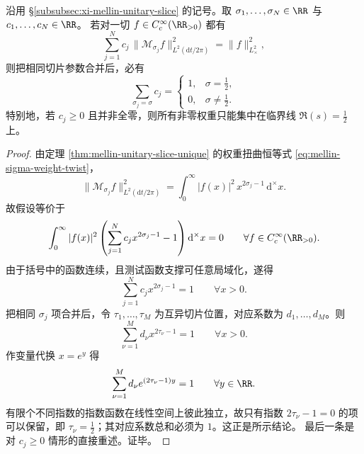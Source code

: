 \begin{theorem}\label{thm:conclusion-mellin-finite-mixture-rigidity}
沿用 \S\ref{subsubsec:xi-mellin-unitary-slice} 的记号。取 \(\sigma_1,\dots,\sigma_N\in\RR\) 与 \(c_1,\dots,c_N\in\RR\)。
若对一切 \(f\in C_c^\infty(\RR_{>0})\) 都有
\[
\sum_{j=1}^N c_j\,\|\mathcal M_{\sigma_j}f\|_{L^2(\mathrm{d}t/2\pi)}^2
=
\|f\|_{L^2_{\times}}^2,
\]
则把相同切片参数合并后，必有
\[
\sum_{\sigma_j=\sigma}c_j=
\begin{cases}
1,& \sigma=\tfrac12,\\
0,& \sigma\neq \tfrac12.
\end{cases}
\]
特别地，若 \(c_j\ge 0\) 且并非全零，则所有非零权重只能集中在临界线 \(\Re(s)=\tfrac12\) 上。
\end{theorem}
\begin{proof}
由定理 \ref{thm:mellin-unitary-slice-unique} 的权重扭曲恒等式 \eqref{eq:mellin-sigma-weight-twist}，
\[
\|\mathcal M_{\sigma_j}f\|_{L^2(\mathrm{d}t/2\pi)}^2
=
\int_0^\infty |f(x)|^2\,x^{2\sigma_j-1}\,\mathrm{d}^{\times}x.
\]
故假设等价于
\[
\int_0^\infty |f(x)|^2
\left(
\sum_{j=1}^N c_j x^{2\sigma_j-1}-1
\right)\mathrm{d}^{\times}x
=
0
\qquad
\forall f\in C_c^\infty(\RR_{>0}).
\]
由于括号中的函数连续，且测试函数支撑可任意局域化，遂得
\[
\sum_{j=1}^N c_j x^{2\sigma_j-1}=1
\qquad
\forall x>0.
\]
把相同 \(\sigma_j\) 项合并后，令 \(\tau_1,\dots,\tau_M\) 为互异切片位置，对应系数为 \(d_1,\dots,d_M\)。则
\[
\sum_{\nu=1}^M d_\nu x^{2\tau_\nu-1}=1
\qquad
\forall x>0.
\]
作变量代换 \(x=e^y\) 得
\[
\sum_{\nu=1}^M d_\nu e^{(2\tau_\nu-1)y}=1
\qquad
\forall y\in\RR.
\]
有限个不同指数的指数函数在线性空间上彼此独立，故只有指数 \(2\tau_\nu-1=0\) 的项可以保留，即 \(\tau_\nu=\tfrac12\)；其对应系数总和必须为 \(1\)。这正是所示结论。
最后一条是对 \(c_j\ge 0\) 情形的直接重述。证毕。
\end{proof}

